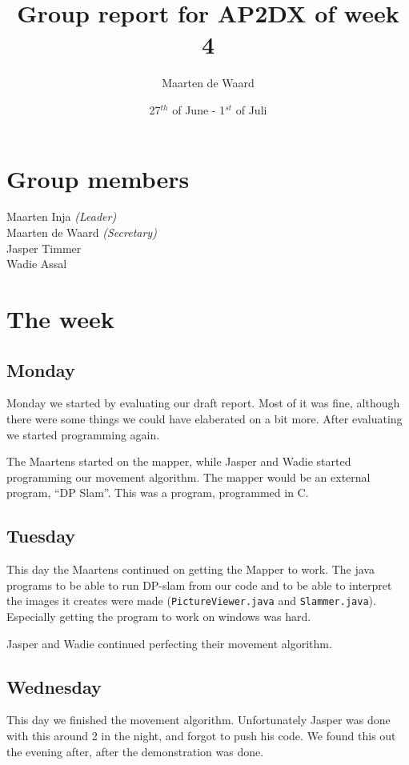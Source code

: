 \documentclass[a4paper,10pt]{article}
\title{Group report for AP2DX of week 4}
\author{Maarten de Waard}
\date{27$^{th}$ of June - 1$^{st}$ of Juli}
\begin{document}
\maketitle

\section*{Group members}
\noindent Maarten Inja \textit{(Leader)}\\
Maarten de Waard \textit{(Secretary)}\\
Jasper Timmer\\
Wadie Assal\\

\section*{The week}
\subsection*{Monday}
Monday we started by evaluating our draft report. Most of it was fine, although there were some things we could have elaberated on a bit more. After evaluating we started programming again. 

The Maartens started on the mapper, while Jasper and Wadie started programming our movement algorithm.
The mapper would be an external program, ``DP Slam''. This was a program, programmed in C. 

\subsection*{Tuesday}
This day the Maartens continued on getting the Mapper to work. The java programs
to be able to run DP-slam from our code and to be able to interpret the images
it creates were made (\texttt{PictureViewer.java} and \texttt{Slammer.java}).
Especially getting the program to work on windows was hard.

Jasper and Wadie continued perfecting their movement algorithm. 

\subsection*{Wednesday}
This day we finished the movement algorithm. Unfortunately Jasper was done with
this around 2 in the night, and forgot to push his code. We found this out the
evening after, after the demonstration was done. 
\end{document}
